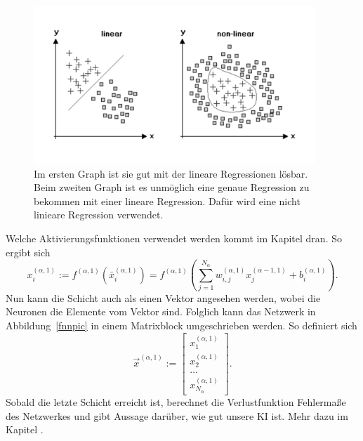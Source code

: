 \documentclass[11pt]{article}
\begin{document}
\begin{figure}[h]
    \centering
    \includegraphics[width=300pt, keepaspectratio]{images/regression}
    \caption[Lineare Regression und nicht lineare Regression]{Im ersten Graph ist sie gut mit der lineare Regressionen lösbar. Beim zweiten Graph ist es
    unmöglich eine genaue Regression zu bekommen mit einer lineare Regression. Dafür wird eine nicht linieare Regression verwendet.}\label{regressionpic}
\end{figure}
Welche Aktivierungsfunktionen verwendet werden kommt im Kapitel  dran. So ergibt sich
\begin{equation}
    x_{i}^{(\alpha,1)} := f^{(\alpha,1)}(\bar{x}_{i}^{(\alpha,1)}) = f^{(\alpha,1)}(\sum_{j=1}^{N_{\alpha}} w_{i,j}^{(\alpha,1)} x_{j}^{(\alpha-1,1)} + b_{i}^{(\alpha,1)}).
\end{equation}
Nun kann die Schicht auch als einen Vektor angesehen werden, wobei die Neuronen die Elemente vom Vektor sind. Folglich kann das Netzwerk
in Abbildung~\ref{fnnpic} in einem Matrixblock umgeschrieben werden. So definiert sich
\begin{equation}\label{withfunction}
    \vec{x}^{(\alpha,1)} := \begin{bmatrix}x_{1}^{(\alpha,1)} \\ x_{2}^{(\alpha,1)} \\ \ldots \\ x_{N_{\alpha}}^{(\alpha,1)} \end{bmatrix}.
\end{equation}
Sobald die letzte Schicht erreicht ist, berechnet die Verlustfunktion Fehlermaße des Netzwerkes und gibt Aussage darüber, wie gut
unsere KI ist. Mehr dazu im Kapitel .
\end{document}

